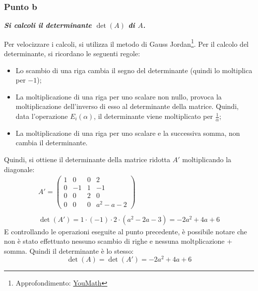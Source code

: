 \documentclass[a4paper]{article}
\begin{document}
	\subsubsection{Punto b}
	
	\textcolor{Green4}{\emph{\textbf{Si calcoli il determinante $\det\left(A\right)$ di $A$.}}}\newline
	
	\noindent
	Per velocizzare i calcoli, si utilizza il metodo di Gauss Jordan\footnote{Approfondimento: \href{https://www.youmath.it/forum/algebra-lineare/52861-determinante-con-eliminazione-di-gauss.html}{YouMath}}. Per il calcolo del determinante, si ricordano le seguenti regole:
	\begin{itemize}
		\item Lo scambio di una riga cambia il segno del determinante (quindi lo moltiplica per $-1$);
		
		\item La moltiplicazione di una riga per uno scalare non nullo, provoca la moltiplicazione dell'inverso di esso al determinante della matrice. Quindi, data l'operazione $E_{i}\left(\alpha\right)$, il determinante viene moltiplicato per $\frac{1}{\alpha}$;
		
		\item La moltiplicazione di una riga per uno scalare e la successiva somma, non cambia il determinante.
	\end{itemize}
	Quindi, si ottiene il determinante della matrice ridotta $A'$ moltiplicando la diagonale:
	\begin{gather*}
		A' = \begin{pmatrix}
			1	& 0		& 0		& 2 \\
			0	& -1	& 1		& -1 \\
			0	& 0		& 2		& 0 \\
			0	& 0		& 0		& a^{2} -a -2
		\end{pmatrix} \\
		\\
		\det\left(A'\right) = 1 \cdot \left(-1\right) \cdot 2 \cdot \left(a^{2}-2a-3\right) = -2a^{2} + 4a +6
	\end{gather*}
	E controllando le operazioni eseguite al punto precedente, è possibile notare che non è stato effettuato nessuno scambio di righe e nessuna moltplicazione + somma. Quindi il determinante è lo stesso:
	\begin{equation*}
		\det\left(A\right) = \det\left(A'\right) = -2a^{2} + 4a +6
	\end{equation*}\newpage
	
\end{document}
